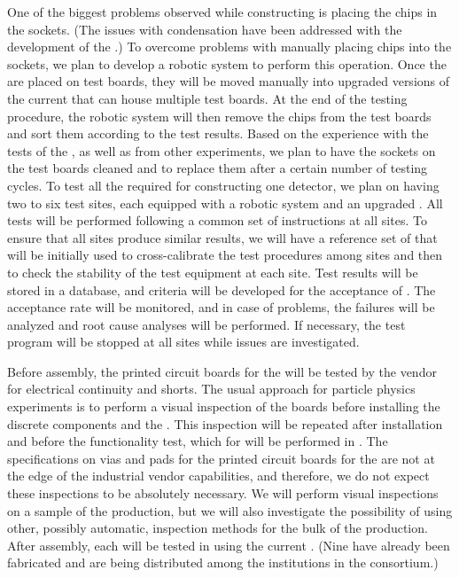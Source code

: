 One of the biggest problems observed while constructing
 is placing the chips in
the sockets. (The issues with condensation
have been addressed with the development of the .)
To overcome problems with manually placing chips into
the sockets, we plan to develop a robotic system
to perform this operation. Once the  are 
placed on test boards, they will be moved manually into 
upgraded versions of the current  that can
house multiple test boards. At the end of the testing
procedure, the robotic system will then remove
the chips from the test boards and sort them according to
the test results. Based on the experience with the tests of
the  , as well as from other experiments,
we plan to have the sockets on the 
test boards cleaned and to replace them after a certain number of
testing cycles. To test all the  required for
constructing one  detector, we plan on having two to six test sites, each equipped with a
robotic system and an upgraded . All tests
will be performed following a common set of instructions
at all sites. To ensure that all sites produce similar
results, we will have a reference set of 
that will be initially used to cross-calibrate the 
test procedures among sites and then to check the 
stability of the test equipment at each site. Test results will
be stored in a database, and criteria will be developed
for the acceptance of . The acceptance rate 
will be monitored, and in case of problems,
the failures will be analyzed and root cause analyses
will be performed. If necessary,
the test program will be stopped at all sites while 
issues are investigated.

Before assembly, the printed circuit boards for the
 will be tested by the vendor for electrical
continuity and shorts. The usual approach for particle physics
experiments is to perform a visual inspection of the boards
before installing the discrete components and 
the . This inspection will be repeated after 
installation and before the functionality test, which for  will be performed in \lntwo. The
specifications on vias and pads for the printed circuit
boards for the  are not at the edge of the
industrial vendor capabilities, and therefore, we do not
expect these inspections to be absolutely necessary. We will
perform visual inspections on a sample of the 
production, but we will also investigate the possibility
of using other, possibly automatic, inspection methods for
the bulk of the production. After assembly, 
each  will be tested in \lntwo using
the current . (Nine have already been
fabricated and are being distributed among the institutions
in the consortium.) 

